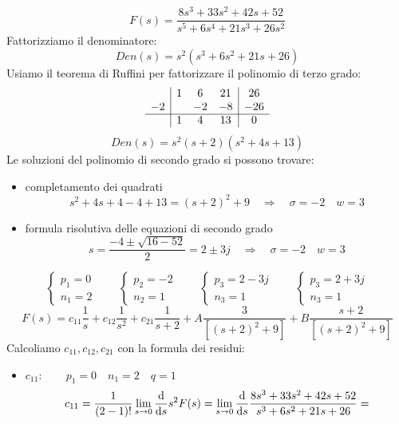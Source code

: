 	\begin{mdframed}[style=Exercise]
		\begin{Exercise}[title={Poli reali multipli, poli complessi semplici}, difficulty=2]
			\[
				F(s) = \frac{8s^3+33s^2+42s+52}{s^5+6s^4+21s^3+26s^2}
			\]
			Fattorizziamo il denominatore:
			\[
				Den(s) = s^2(s^3+6s^2+21s+26)
			\]
			Usiamo il teorema di Ruffini per fattorizzare il polinomio di terzo grado:
			\[ 
				\begin{array}{c|ccc|c}
						& 1 & 6  & 21 & 26  \\ 
					-2 	&   & -2 & -8 & -26 \\ \cline{1-5}
						& 1 & 4  & 13 & 0
				\end{array} 
			\]
			\[
				Den(s) = s^2(s+2)(s^2+4s+13)
			\]
			Le soluzioni del polinomio di secondo grado si possono trovare:
			\begin{itemize}
				\item 
					completamento dei quadrati
					\[
						s^2+4s+4-4+13 = (s+2)^2+9 \quad \Rightarrow \quad \sigma=-2 \quad w=3
					\]
				\item
					formula risolutiva delle equazioni di secondo grado
					\[
						s = \frac{-4 \pm \sqrt{16-52}}{2} = 2 \pm 3j \quad \Rightarrow \quad \sigma=-2 \quad w=3
					\]
			\end{itemize}
			\[
				\begin{cases}
					p_1 = 0\\
					n_1 = 2
				\end{cases}
				\qquad
				\begin{cases}
					p_2 = -2\\
					n_2 = 1
				\end{cases}
				\qquad
				\begin{cases}
					p_3 = 2-3j\\
					n_3 = 1
				\end{cases}
				\qquad
				\begin{cases}
					p_3 = 2+3j\\
					n_3 = 1
				\end{cases}
			\]
			\[
				F(s) = c_{11} \frac{1}{s} + c_{12} \frac{1}{s^2} + c_{21} \frac{1}{s+2} + A \frac{3}{[(s+2)^2+9]} + B \frac{s+2}{[(s+2)^2+9]}
			\]
			\smallskip
			Calcoliamo $ c_{11}, c_{12}, c_{21} $ con la formula dei residui:
			\begin{itemize}
				\item $ c_{11}: \qquad p_1=0 \quad n_1=2 \quad q=1 $
				\begin{align*}
					c_{11} &= \frac{1}{(2-1)!} \lim\limits_{s \rightarrow 0} \der{}{s} s^2F(s) =	\lim\limits_{s \rightarrow 0} \der{}{s} \frac{8s^3+33s^2+42s+52}{s^3+6s^2+21s+26} = \\

\end{align*}
\end{itemize}
\end{Exercise}
\end{mdframed}
